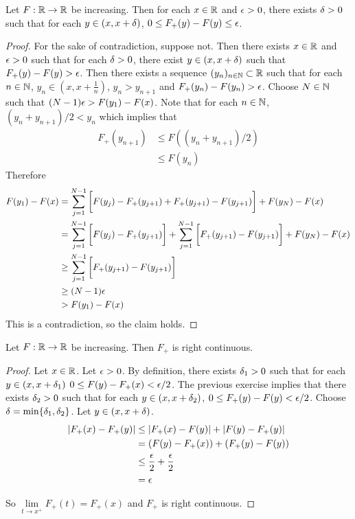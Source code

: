 \documentclass{book}
\begin{document}
	\begin{ex}  
		Let $F:\mathbb{R} \rightarrow \mathbb{R}$ be increasing. Then for each $x \in \mathbb{R}$ and $ \epsilon>0$, there exists $\delta >0$ such that for each $y \in (x,x+\delta)$, $0 \leq F_+(y) - F(y) \leq \epsilon$.
	\end{ex}
	
	\begin{proof}
		For the sake of contradiction, suppose not. Then there exists $x \in \mathbb{R}$ and $\epsilon >0$ such that for each $\delta >0$, there exist $y \in (x,x+\delta)$ such that $F_+(y) - F(y) > \epsilon$. Then there exists a sequence $(y_n)_{n \in \mathbb{N}} \subset \mathbb{R}$ such that for each $n \in \mathbb{N}$, $y_n \in (x, x+\frac{1}{n})$, $y_n > y_{n+1}$ and $F_+(y_n) - F(y_n) > \epsilon$. Choose $N \in \mathbb{N}$ such that $(N-1)\epsilon > F(y_1) - F(x)$. Note that for each $n \in \mathbb{N}$, $(y_n + y_{n+1})/ 2 < y_n$ which implies that
		\begin{align*}
			F_+(y_{n+1})
			& \leq F((y_n + y_{n+1})/ 2) \\
			& \leq F(y_n)
		\end{align*}
		Therefore
		\begin{align*}
			F(y_1) - F(x) 
			&= \sum\limits_{j=1}^{N-1} \bigg[F(y_j)-F_+(y_{j+1}) + F_+(y_{j+1}) - F(y_{j+1}) \bigg] + F(y_N)- F(x)\\
			& = \sum\limits_{j=1}^{N-1} \bigg[F(y_j)-F_+(y_{j+1}) \bigg] + \sum\limits_{j=1}^{N-1} \bigg[ F_+(y_{j+1}) - F(y_{j+1}) \bigg] + F(y_N)- F(x) \\
			& \geq \sum\limits_{j=1}^{N-1} \bigg[ F_+(y_{j+1}) - F(y_{j+1}) \bigg]  \\
			& \geq (N-1)\epsilon \\
			& > F(y_1) - F(x)
		\end{align*}
		This is a contradiction, so the claim holds.
	\end{proof}
	
	\begin{ex}  
		Let $F:\mathbb{R} \rightarrow \mathbb{R}$ be increasing. Then $F_+$ is right continuous. 
	\end{ex}
	
	\begin{proof}
		Let $x \in \mathbb{R}$. Let $\epsilon >0$. By definition, there exists $\delta_1>0$ such that for each $y \in (x,x+\delta_1)$ $0 \leq F(y)-F_+(x) < \epsilon/2$. The previous exercise implies that there exists $\delta_2 >0$ such that for each $y \in (x,x+\delta_2)$, $0 \leq F_+(y)-F(y) < \epsilon/2$. Choose $\delta = \min\{\delta_1, \delta_2\}$. Let $y \in (x, x+\delta)$.
		\begin{align*}
			|F_+(x) - F_+(y)|
			& \leq |F_+(x) - F(y)| + |F(y)- F_+(y)| \\
			& = (F(y) - F_+(x)) + (F_+(y) - F(y)) \\
			& \leq \frac{\epsilon}{2} + \frac{\epsilon}{2}\\
			& = \epsilon
		\end{align*}
		
		So $\lim\limits_{t \rightarrow x^+} F_+(t) = F_+(x)$ and $F_+$ is right continuous.
	\end{proof}
	
\end{document}
